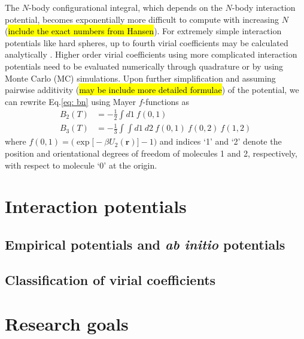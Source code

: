         The $N$-body configurational integral, which depends on the $N$-body interaction potential, becomes exponentially more difficult to compute with increasing $N$ (\hl{include the exact numbers from Hansen}). For extremely simple interaction potentials like hard spheres, up to fourth virial coefficients may be calculated analytically \cite{Masters2008}. Higher order virial coefficients using more complicated interaction potentials need to be evaluated numerically through quadrature or by using Monte Carlo (MC) simulations. Upon further simplification and assuming pairwise additivity (\hl{may be include more detailed formulae}) of the potential, we can rewrite Eq.\eqref{eq: bn} using Mayer $f$-functions as \cite{Masters2008,Hansen}
        \begin{equation} \label{eq: mayerfn}
            \begin{aligned}
                B_2(T) &= -\frac{1}{2} \displaystyle\int d1 ~ f(0,1)\\
                B_3(T) &= -\frac{1}{3} \displaystyle\int \int d1~d2~f(0,1)~f(0,2)~f(1,2)
            \end{aligned}
        \end{equation}
        where $f(0,1) = \Big( \exp \big[ -\beta U_2(\bm{r}) \big] - 1 \Big) $ and indices `1' and `2' denote the position and orientational degrees of freedom of molecules 1 and 2, respectively, with respect to molecule `0' at the origin.
    \section{Interaction potentials}
        \subsection{Empirical potentials and \emph{ab initio} potentials}
        \subsection{Classification of virial coefficients}
    \section{Research goals}

